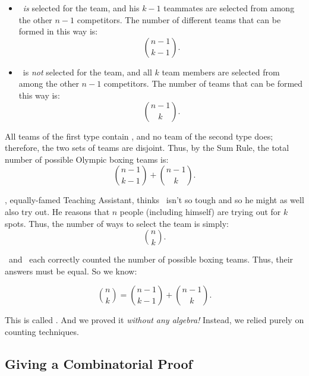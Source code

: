 \begin{itemize}

\item \Jay\ \emph{is} selected for the team, and his $k - 1$
  teammates are selected from among the other $n - 1$ competitors.
  The number of different teams that can be formed in this way is:
%
\[
    \binom{n-1}{k-1}.
\]

\item \Jay\ is \emph{not} selected for the team, and all $k$ team
members are selected from among the other $n - 1$ competitors.  The
number of teams that can be formed this way is:
%
\[
    \binom{n - 1}{k}.
\]

\end{itemize}

All teams of the first type contain \Jay, and no team of the second
type does; therefore, the two sets of teams are disjoint.  Thus, by
the Sum Rule, the total number of possible Olympic boxing teams is:
%
\[
    \binom{n-1}{k-1} + \binom{n - 1}{k}.
\]

\Jer, equally-famed Teaching Assistant, thinks \Jay\ isn't so tough
and so he might as well also try out.  He reasons that $n$ people
(including himself) are trying out for $k$ spots.  Thus, the number of
ways to select the team is simply:
%
\[
    \binom{n}{k}.
\]

\Jer\ and \Jay\ each correctly counted the number of possible boxing
teams.  Thus, their answers must be equal.  So we know:
%
\begin{lemma}
\begin{equation}\label{pascal-ident}
    \binom{n}{k} = \binom{n-1}{k-1} + \binom{n - 1}{k}.
\end{equation}
\end{lemma}
%
This is called .  And we proved it
\emph{without any algebra!}  Instead, we relied purely on counting
techniques.


\subsection{Giving a Combinatorial Proof}

